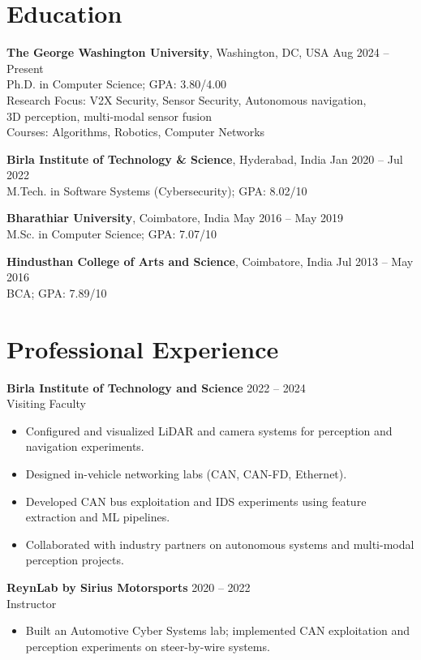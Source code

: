 \documentclass[a4paper,11pt]{article}
\begin{document}
\section*{Education}
\noindent
\textbf{The George Washington University}, Washington, DC, USA \hfill Aug 2024 -- Present \\
Ph.D. in Computer Science; GPA: 3.80/4.00 \\
Research Focus: V2X Security, Sensor Security, Autonomous navigation, \\3D perception, multi-modal sensor fusion\\
Courses: Algorithms, Robotics, Computer Networks
\vspace{6pt}

\noindent
\textbf{Birla Institute of Technology \& Science}, Hyderabad, India \hfill Jan 2020 -- Jul 2022 \\
M.Tech. in Software Systems (Cybersecurity); GPA: 8.02/10
\vspace{6pt}

\noindent
\textbf{Bharathiar University}, Coimbatore, India \hfill May 2016 -- May 2019 \\
M.Sc. in Computer Science; GPA: 7.07/10
\vspace{6pt}

\noindent
\textbf{Hindusthan College of Arts and Science}, Coimbatore, India \hfill Jul 2013 -- May 2016 \\
BCA; GPA: 7.89/10

\section*{Professional Experience}

\noindent
\textbf{Birla Institute of Technology and Science} \hfill 2022 -- 2024\\
Visiting Faculty 
\begin{itemize}
    \item Configured and visualized LiDAR and camera systems for perception and navigation experiments.
    \item Designed in-vehicle networking labs (CAN, CAN-FD, Ethernet).
    \item Developed CAN bus exploitation and IDS experiments using feature extraction and ML pipelines.
    \item Collaborated with industry partners on autonomous systems and multi-modal perception projects.
\end{itemize}

\noindent
\textbf{ReynLab by Sirius Motorsports} \hfill 2020 -- 2022\\
Instructor
\begin{itemize}
    \item Built an Automotive Cyber Systems lab; implemented CAN exploitation and \\perception experiments on steer-by-wire systems.
\end{itemize}
\end{document}
